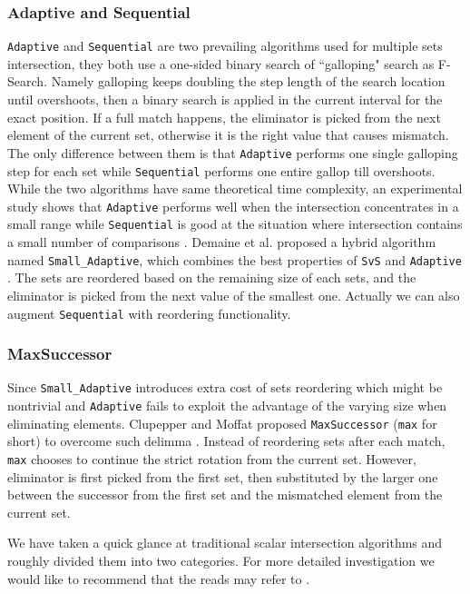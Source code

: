 \documentclass[runningheads,a4paper]{llncs}
\begin{document}
\subsubsection{Adaptive and Sequential}
\texttt{Adaptive} \cite{Demaine2000Adaptive} and \texttt{Sequential} \cite{Barbay2006Faster} are two prevailing algorithms used for multiple sets intersection, they both use a one-sided binary search of ``galloping" search as F-Search.
Namely galloping keeps doubling the step length of the search location until overshoots, then a binary search is applied in the current interval for the exact position.
If a full match happens, the eliminator is picked from the next element of the current set, otherwise it is the right value that causes mismatch.
The only difference between them is that \texttt{Adaptive} performs one single galloping step for each set while \texttt{Sequential} performs one entire gallop till overshoots.
While the two algorithms have same theoretical time complexity, an experimental study shows that \texttt{Adaptive} performs well 
when the intersection concentrates in a small range while \texttt{Sequential} is good at the situation where intersection contains a small number of comparisons \cite{Barbay2006Faster}.
Demaine et al. proposed a hybrid algorithm named \texttt{Small\_Adaptive}, which combines the best properties of \texttt{SvS} and \texttt{Adaptive} \cite{Demaine2001Experiments}.
The sets are reordered based on the remaining size of each sets, and the eliminator is picked from the next value of the smallest one.
Actually we can also augment \texttt{Sequential} with reordering functionality.
\subsubsection{MaxSuccessor}
Since \texttt{Small\_Adaptive} introduces extra cost of sets reordering which might be nontrivial and \texttt{Adaptive} fails to exploit the advantage of the varying size when eliminating elements.
Clupepper and Moffat proposed \texttt{MaxSuccessor} (\texttt{max} for short) to overcome such delimma \cite{Culpepper2007Compact}.
Instead of reordering sets after each match, \texttt{max} chooses to continue the strict rotation from the current set.
However, eliminator is first picked from the first set, then substituted by the larger one between the successor from the first set and the mismatched element from the current set.

We have taken a quick glance at traditional scalar intersection algorithms and roughly divided them into two categories.
For more detailed investigation we would like to recommend that the reads may refer to \cite{J2010An,culpepper2010efficient}.
\end{document}
